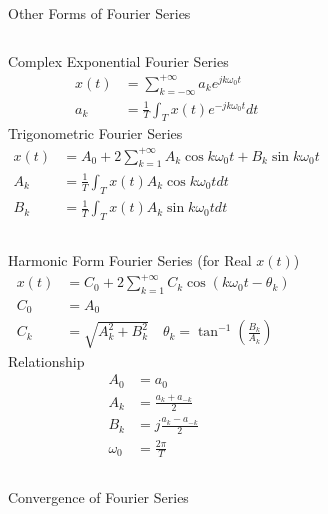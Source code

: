 \begin{frame}[plain]{Other Forms of Fourier Series}
    \begin{columns}
    Complex Exponential Fourier Series
            \begin{equation}
                \begin{aligned}
                    x(t) &= \sum_{k=-\infty}^{+\infty}a_k e^{jk\omega_0 t}\\
                    a_k &= \frac{1}{T} \int_{T}x(t)e^{-jk\omega_0 t}dt
                \end{aligned}
            \end{equation}
    Trigonometric Fourier Series
            \begin{equation}
                \begin{aligned}
                    x(t) &= A_0 + 2\sum_{k=1}^{+\infty} A_k\cos k\omega_0 t + B_k\sin k\omega_0 t\\
                    A_k &= \frac{1}{T} \int_{T}x(t)A_k\cos k\omega_0 t dt\\
                    B_k &= \frac{1}{T} \int_{T}x(t)A_k\sin k\omega_0 t dt
                \end{aligned}
            \end{equation}
    \end{columns}

    \begin{columns}
    Harmonic Form  Fourier Series (for Real $x(t)$)
            \begin{equation}
                \begin{aligned}
                    x(t) &= C_0 + 2\sum_{k=1}^{+\infty} C_k\cos (k\omega_0 t - \theta_k)\\
                    C_0 &= A_0\\
                    C_k &= \sqrt{A_k^2 + B_k^2} \quad                     \theta_k = \tan^{-1}\left(\frac{B_k}{A_k}\right)
                \end{aligned}
            \end{equation}
    Relationship
        \begin{equation}
            \begin{aligned}
                A_0 &= a_0\\
                A_k &= \frac{a_k + a_{-k}}{2}\\
                B_k &= j\frac{a_k - a_{-k}}{2}\\
                \omega_0 &= \frac{2\pi}{T}
            \end{aligned}
        \end{equation}
    \end{columns}




\end{frame}


\begin{frame}{Convergence of Fourier Series}
\end{frame}


